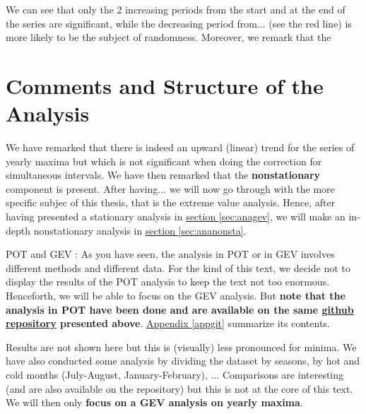 We can see that only the 2 increasing periods from the start and at the end of the series are significant, while the decreasing period from... (see the red line) is more likely to be the subject of randomness. Moreover, we remark that the 


\section{Comments and Structure of the Analysis }

 We have remarked that there is indeed an upward (linear) trend for the series of yearly maxima but which is not significant when doing the correction for simultaneous intervals.
We have then remarked that the \textbf{nonstationary} component is present. After having... we will now go through with the more specific subjec of this thesis, that is the extreme value analysis. Hence, after having presented a stationary analysis in \hyperref[sec:anagev]{section \ref{sec:anagev}}, we will make an in-depth nonstationary analysis in \hyperref[sec:ananonsta]{section \ref{sec:ananonsta}}.


POT and GEV : 
As you have seen, the analysis in POT or in GEV involves different methods and different data. For the kind of this text, we decide not to display the results of the POT analysis to keep the text not too enormous. Henceforth, we will be able to focus on the GEV analysis. But\textbf{ note that the analysis in POT have been done and are available on the same \hyperref[xxx]{github repository} presented above}.
\hyperref[appgit]{Appendix \ref{appgit}} summarize its contents.


Results are not shown here but this is (visually) less pronounced for minima. We have also conducted some analysis by dividing the dataset by seasons, by hot and cold months (July-August, January-February), ... 
Comparisons are interesting (and are also available on the repository) but this is not at the core of this text. 
We will then only \textbf{focus on a GEV analysis on yearly maxima}.